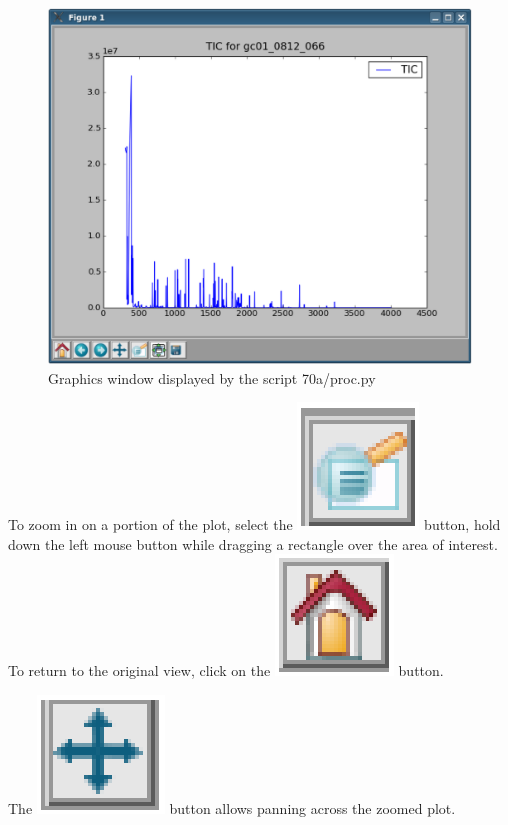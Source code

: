 \begin{figure}
  \begin{center}
    \includegraphics[scale=0.33]{graphics/chapter07/test-70a.eps}
  \end{center}
  \caption{Graphics window displayed by the script 70a/proc.py}
  \label{fig:70a}
\end{figure}

To zoom in on a portion of the plot, select the
\includegraphics[scale=0.5]{graphics/chapter07/magnifier_button.eps}
button, hold down the left mouse button while dragging a rectangle over
the area of interest. To return to the original view, click on the
\includegraphics[scale=0.5]{graphics/chapter07/home_button.eps} button.

The 
\includegraphics[scale=0.5]{graphics/chapter07/cross_button.eps}
button allows panning across the zoomed plot. 

